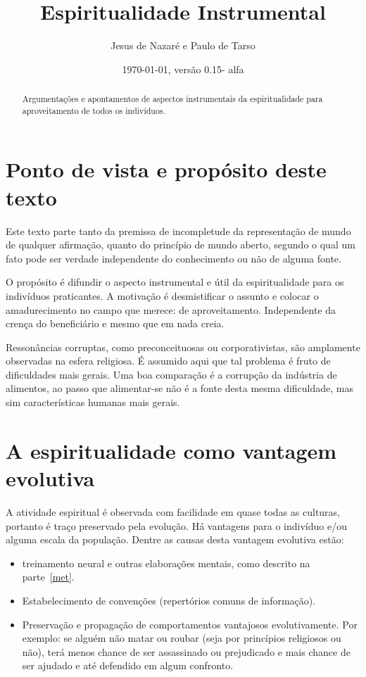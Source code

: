 \documentclass[a4paper]{article}
\title{Espiritualidade Instrumental}
\author{Jesus de Nazaré e Paulo de Tarso}
\date{\today, versão 0.15- alfa}
\begin{document}
\maketitle

\begin{abstract}
Argumentações e apontamentos de aspectos instrumentais da espiritualidade para
aproveitamento de todos os indivíduos.
\end{abstract}

\tableofcontents

\section{Ponto de vista e propósito deste texto}

Este texto parte tanto da premissa de incompletude da representação de mundo de
qualquer afirmação, quanto do princípio de mundo aberto, segundo o qual um fato
pode ser verdade independente do conhecimento ou não de alguma fonte.

O propósito é difundir o aspecto instrumental e útil da espiritualidade para os
indivíduos praticantes. A motivação é desmistificar o assunto e colocar o
amadurecimento no campo que merece: de aproveitamento. Independente da crença do
beneficiário e mesmo que em nada creia.

Ressonâncias corruptas, como preconceituosas ou corporativistas, são amplamente
observadas na esfera religiosa. É assumido aqui que tal problema é fruto de
dificuldades mais gerais. Uma boa comparação é a corrupção da indústria de
alimentos, ao passo que alimentar-se não é a fonte desta mesma dificuldade, mas
sim características humanas mais gerais.

\section{A espiritualidade como vantagem evolutiva}

A atividade espiritual é observada com facilidade em quase todas as culturas,
portanto é traço preservado pela evolução. Há vantagens para o indivíduo e/ou
alguma escala da população. Dentre as causas desta vantagem evolutiva estão:

\begin{itemize}
  \item treinamento neural e outras elaborações mentais, como descrito na
  parte~\ref{met}.

  \item Estabelecimento de convenções (repertórios comuns de informação).

  \item Preservação e propagação de comportamentos vantajosos evolutivamente.
  Por exemplo: se alguém não matar ou roubar (seja por princípios religiosos ou
  não), terá menos chance de ser assassinado ou prejudicado e mais chance de ser
  ajudado e até defendido em algum confronto.
\end{itemize}
\end{document}
